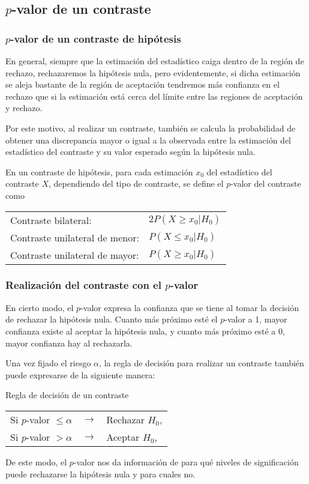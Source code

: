 \subsection{$p$-valor de un contraste}
\begin{frame}
\frametitle{$p$-valor de un contraste de hipótesis}
En general, siempre que la estimación del estadístico caiga dentro de la región de rechazo, rechazaremos la hipótesis nula, pero evidentemente, si dicha estimación se aleja bastante de la región de aceptación tendremos más confianza en el rechazo que si la estimación está cerca del límite entre las regiones de aceptación y rechazo.

Por este motivo, al realizar un contraste, también se calcula la probabilidad de obtener una discrepancia mayor o igual a la observada entre la estimación del estadístico del contraste y su valor esperado según la hipótesis nula.
\begin{definicion}[$p$-valor]
En un contraste de hipótesis, para cada estimación $x_0$ del estadístico del contraste $X$, dependiendo del tipo de
contraste, se define el $p$-valor del contraste como
\begin{center}
\begin{tabular}{ll}
Contraste bilateral: & $2P(X\geq x_0|H_0)$\\
Contraste unilateral de menor: & $P(X\leq x_0|H_0)$\\
Contraste unilateral de mayor: & $P(X\geq x_0|H_0)$
\end{tabular}
\end{center}
\end{definicion}
\end{frame}


\begin{frame}
\frametitle{Realización del contraste con el $p$-valor}
En cierto modo, el $p$-valor expresa la confianza que se tiene al tomar la decisión de rechazar la hipótesis nula.
Cuanto más próximo esté el $p$-valor a 1, mayor confianza existe al aceptar la hipótesis nula, y cuanto más próximo esté a 0, mayor confianza hay al rechazarla.

Una vez fijado el riesgo $\alpha$, la regla de decisión para realizar un contraste también puede expresarse de la siguiente manera:
\begin{alertblock}{Regla de decisión de un contraste}
\begin{center}
\begin{tabular}{lcl}
Si $p$-valor $\leq \alpha$ & $\rightarrow$ & Rechazar $H_0$,\\
Si $p$-valor $> \alpha$ & $\rightarrow$ & Aceptar $H_0$,\\
\end{tabular}
\end{center}
\end{alertblock}
De este modo, el $p$-valor nos da información de para qué niveles de significación puede rechazarse la hipótesis nula y para cuales no.
\end{frame}


